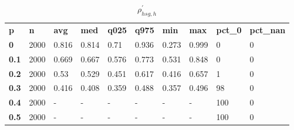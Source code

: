\begin{table}[h]
 \centering 
\footnotesize
\caption{$\rho_{hsg,h}^\prime $}
\label{tab:alphahsgh}
\begin{tabular}[h]{| l l l l l l l l l l|
    } \hline
\textbf{ p} & \textbf{ n} & \textbf{ avg} & \textbf{ med} & \textbf{ q025} & \textbf{ q975} & \textbf{ min} & \textbf{ max} & \textbf{ pct\_0} & \textbf{ pct\_nan}
           \\
  \textbf{  0} & 2000 & 0.816 & 0.814 &  0.71 & 0.936 & 0.273 & 0.999 &   0 & 0
           \\
  \textbf{0.1} & 2000 & 0.669 & 0.667 & 0.576 & 0.773 & 0.531 & 0.848 &   0 & 0
           \\
  \textbf{0.2} & 2000 &  0.53 & 0.529 & 0.451 & 0.617 & 0.416 & 0.657 &   1 & 0
           \\
  \textbf{0.3} & 2000 & 0.416 & 0.408 & 0.359 & 0.488 & 0.357 & 0.496 &  98 & 0
           \\
  \textbf{0.4} & 2000 & - & - & - & - & - & - & 100 & 0
           \\
  \textbf{0.5} & 2000 & - & - & - & - & - & - & 100 & 0
           \\
 \hline \end{tabular}
 \end{table}
